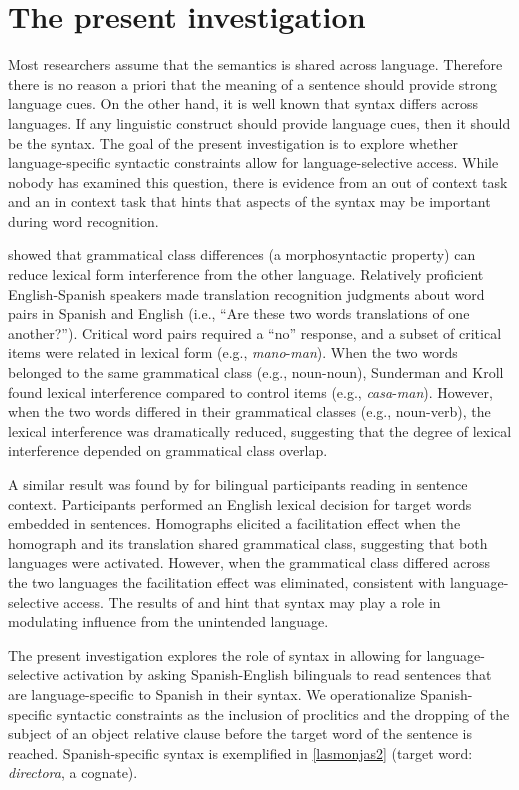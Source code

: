 \section{The present investigation}\label{Intro::PresentInvestigation}
Most researchers assume that the semantics is shared across language. Therefore there is no reason a priori that the meaning of a sentence should provide strong language cues. On the other hand, it is well known that syntax differs across languages. If any linguistic construct should provide language cues, then it should be the syntax. The goal of the  present investigation  is to  explore whether language-specific syntactic constraints allow for language-selective access. While nobody has examined this question, there is evidence from an out of context task and an in context task that hints that aspects of the syntax may be important during word recognition.

\textcite{Sunderman2006} showed that grammatical class differences (a morphosyntactic property) can reduce lexical form interference from the other language. Relatively proficient English-Spanish speakers made translation recognition judgments about word pairs in Spanish and English (i.e., ``Are these two words translations of one another?''). Critical word pairs required a ``no'' response, and a subset of critical items were related in lexical form (e.g., \textit{mano}-\textit{man}). When the two words belonged to the same grammatical class (e.g., noun-noun),  Sunderman and Kroll found lexical interference compared to control items (e.g., \textit{casa}-\textit{man}). However, when the two words differed in their grammatical classes (e.g., noun-verb), the lexical interference was dramatically reduced, suggesting that the degree of lexical interference depended on grammatical class overlap. 

A similar result was found by \textcite{Baten2010} for bilingual participants reading in sentence context. Participants performed an English lexical decision for target words embedded in sentences. Homographs elicited a facilitation effect when the homograph and its translation shared grammatical class, suggesting that both languages were activated. However, when the grammatical class differed across the two languages the facilitation effect was eliminated, consistent with language-selective access. The results of \textcite{Sunderman2006} and \textcite{Baten2010}  hint that syntax may play a role in modulating  influence from the unintended language.

The present investigation explores the role of syntax in allowing for language-selective activation by asking Spanish-English bilinguals to read sentences that are language-specific to Spanish in their syntax. We operationalize Spanish-specific syntactic constraints as the inclusion of proclitics and the dropping of the subject of an object relative clause before the target word of the sentence is reached. Spanish-specific syntax is exemplified in \ref{lasmonjas2} (target word: \textit{directora}, a cognate).

